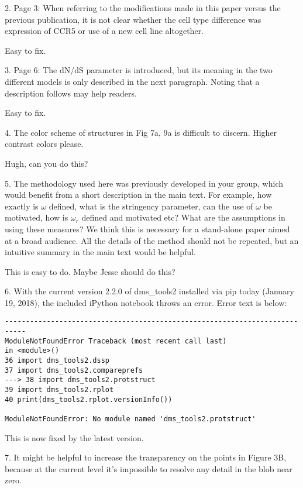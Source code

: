 \documentclass[11pt, oneside]{article}   	%
\begin{document}
2. Page 3: When referring to the modifications made in this paper versus the previous publication, it is not clear whether the cell type difference was expression of CCR5 or use of a new cell line altogether. 

{\color{red}
Easy to fix.
}

3. Page 6: The dN/dS parameter is introduced, but its meaning in the two different models is only described in the next paragraph. Noting that a description follows may help readers. 

{\color{red}
Easy to fix.}

4. The color scheme of structures in Fig 7a, 9a is difficult to discern. Higher contrast colors please. 

{\color{red}
Hugh, can you do this?}

5. The methodology used here was previously developed in your group, which would benefit from a short description in the main text. For example, how exactly is $\omega$ defined, what is the stringency parameter, can the use of $\omega$ be motivated, how is $\omega_r$ defined and motivated etc? What are the assumptions in using these measures? We think this is necessary for a stand-alone paper aimed at a broad audience. All the details of the method should not be repeated, but an intuitive summary in the main text would be helpful. 

{\color{red}
This is easy to do. Maybe Jesse should do this?}

6. With the current version 2.2.0 of dms\_tools2 installed via pip today (January 19, 2018), the included iPython notebook throws an error. Error text is below: 
\begin{verbatim}
--------------------------------------------------------------------------- 
ModuleNotFoundError Traceback (most recent call last) 
in <module>() 
36 import dms_tools2.dssp 
37 import dms_tools2.compareprefs 
---> 38 import dms_tools2.protstruct 
39 import dms_tools2.rplot 
40 print(dms_tools2.rplot.versionInfo()) 

ModuleNotFoundError: No module named 'dms_tools2.protstruct'
\end{verbatim}

{\color{red}
This is now fixed by the latest version.}

7. It might be helpful to increase the transparency on the points in Figure 3B, because at the current level it's impossible to resolve any detail in the blob near zero. 
\end{document}
